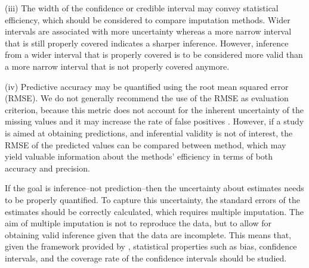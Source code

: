 \documentclass[bimj,fleqn]{w-art}
\begin{document}
(iii) The width of the confidence or credible interval may convey statistical efficiency, which should be considered to compare imputation methods. Wider intervals are associated with more uncertainty whereas a more narrow interval that is still properly covered indicates a sharper inference. However, inference from a wider interval that is properly covered is to be considered more valid than a more narrow interval that is not properly covered anymore. 

(iv) Predictive accuracy may be quantified using the root mean squared error (RMSE). We do not generally recommend the use of the RMSE as evaluation criterion, because this metric does not account for the inherent uncertainty of the missing values and it may increase the rate of false positives \citep[][]{buur18}. However, if a study is aimed at obtaining predictions, and inferential validity is not of interest, the RMSE of the predicted values can be compared between method, which may yield valuable information about the methods' efficiency in terms of both accuracy and precision. 

If the goal is inference--not prediction--then the uncertainty about estimates needs to be properly quantified. To capture this uncertainty, the standard errors of the estimates should be correctly calculated, which requires multiple imputation. The aim of multiple imputation is not to reproduce the data, but to allow for obtaining valid inference given that the data are incomplete. This means that, given the framework provided by \citet{rubi87}, statistical properties such as bias, confidence intervals, and the coverage rate of the confidence intervals should be studied. 
\end{document}
